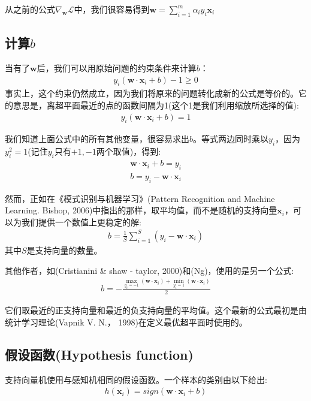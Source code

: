 从之前的公式$\nabla_\mathbf{w} \mathcal{L}$中，我们很容易得到$\mathbf{w} = \sum\limits_{i=1}^m \alpha_i y_i \mathbf{x}_i$


\subsection{计算$b$}
当有了$\mathbf{w}$后，我们可以用原始问题的约束条件来计算$b$：
\begin{gather*}
y_i (\mathbf{w} \cdot \mathbf{x}_i + b) -1 \geq 0
\end{gather*}
事实上，这个约束仍然成立，因为我们将原来的问题转化成新的公式是等价的。它的意思是，离超平面最近的点的函数间隔为1(这个1是我们利用缩放所选择的值):
\begin{gather*}
y_i (\mathbf{w} \cdot \mathbf{x}_i + b) = 1
\end{gather*}

我们知道上面公式中的所有其他变量，很容易求出$b$。等式两边同时乘以$y_i$，因为$y_i^2=1$(记住$y_i$只有$+1,-1$两个取值)，得到:
\begin{gather*}
\mathbf{w} \cdot \mathbf{x}_i + b = y_i \\
b = y_i - \mathbf{w} \cdot \mathbf{x}_i
\end{gather*}

然而，正如在《模式识别与机器学习》(Pattern Recognition and Machine Learning. Bishop, 2006)中指出的那样，取平均值，而不是随机的支持向量$\mathbf{x}_i$，可以为我们提供一个数值上更稳定的解:
\begin{gather*}
b = \frac{1}{S} \sum_{i=1}^S(y_i - \mathbf{w} \cdot \mathbf{x}_i)
\end{gather*}
其中$S$是支持向量的数量。

其他作者，如(Cristianini \& shaw - taylor, 2000)和(Ng)，使用的是另一个公式:
\begin{gather*}
b = - \frac{\max_{y_i=-1}(\mathbf{w} \cdot \mathbf{x}_i)+\min_{y_i=1}(\mathbf{w} \cdot \mathbf{x}_i)}{2}
\end{gather*}

它们取最近的正支持向量和最近的负支持向量的平均值。这个最新的公式最初是由统计学习理论(Vapnik V. N.， 1998)在定义最优超平面时使用的。

\subsection{假设函数(Hypothesis function)}

支持向量机使用与感知机相同的假设函数。一个样本的类别由以下给出:
\begin{gather*}
h(\mathbf{x}_i) = sign(\mathbf{w} \cdot \mathbf{x}_i+b)
\end{gather*}

